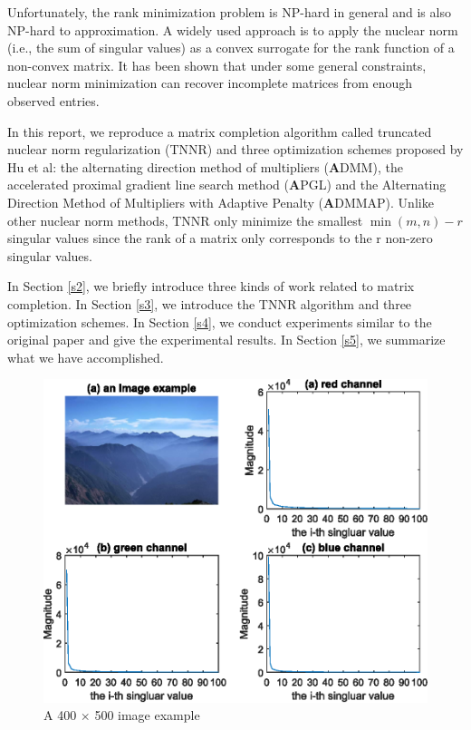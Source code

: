\documentclass{article}
\begin{document}
{Unfortunately, the rank minimization problem is NP-hard in general and is also NP-hard to approximation.  A widely used approach is to apply the nuclear norm (i.e., the sum of singular values) as a convex surrogate for the rank function of a non-convex matrix. It has been shown that under some general constraints, nuclear norm minimization can recover incomplete matrices from enough observed entries.

In this report, we reproduce a matrix completion algorithm called truncated nuclear norm regularization (TNNR) and three optimization schemes proposed by Hu et al\cite{hu.he201309}: the alternating direction method of multipliers (\textbf ADMM), the accelerated proximal gradient line search method (\textbf APGL) and the Alternating Direction Method of Multipliers with Adaptive Penalty (\textbf ADMMAP). 
Unlike other nuclear norm methods, TNNR only minimize the smallest $\min(m, n) - r$  singular values since the rank of a matrix only corresponds to the r non-zero singular values. 

In Section \ref{s2}, we briefly introduce three kinds of work related to matrix completion. In Section \ref{s3}, we introduce the TNNR algorithm and three optimization schemes. In Section \ref{s4}, we conduct experiments similar to the original paper and give the experimental results. In Section \ref{s5}, we summarize what we have accomplished.

\begin{figure}[ht]
    \centering
    \includegraphics[]{assets/fig1.eps}
    \caption{A 400 $\times$ 500 image example}
    \label{fig1}
\end{figure}

}
\end{document}
